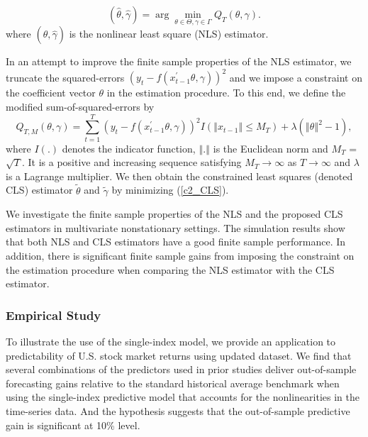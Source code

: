 \documentclass[a4paper,12pt,times,numbered,print,index]{report}
\numberwithin{equation}{section}
\begin{document}
\begin{equation*}
\left( \widehat{\theta},\widehat{\gamma}\right) =\arg \min_{\theta \in \Theta
	,\gamma \in \Gamma }Q_{T}\left( \theta ,\gamma \right) .  
\end{equation*}%
where $\left( \widehat{\theta},\widehat{\gamma}\right)$ is the nonlinear least square (NLS) estimator. 

In an attempt to improve the finite sample properties of the NLS estimator, we truncate the squared-errors $\left( y_{t}-f\left(
x_{t-1}^{\prime }\theta ,\gamma \right) \right) ^{2}$ and we impose a constraint on the coefficient vector $\theta $ in the estimation procedure. To this end, we define the modified sum-of-squared-errors by%
\begin{equation}
Q_{T,M}\left( \theta ,\gamma \right) =\sum_{t=1}^{T}\left( y_{t}-f\left(
x_{t-1}^{\prime }\theta ,\gamma \right) \right) ^{2}I\left( \left\Vert
x_{t-1}\right\Vert \leq M_{T}\right) +\lambda \left( \left\Vert \theta
\right\Vert ^{2}-1\right) ,  
\label{c2_CLS}
\end{equation}%
where $I\left( .\right) $ denotes the indicator function, $%
\left\Vert .\right\Vert $ is the Euclidean norm and $M_T$ = $\sqrt{T}$. It is a positive and increasing sequence satisfying $ M_{T}\rightarrow \infty $ as $T \rightarrow \infty $ and $\lambda $ is a Lagrange
multiplier. We then obtain the constrained least squares (denoted CLS) estimator $\tilde{\theta }$ and $\tilde{\gamma}$ by minimizing (\ref{c2_CLS}).

We investigate the finite sample properties of the NLS and the proposed CLS estimators in multivariate nonstationary settings. The simulation results show that both NLS and CLS estimators have a good finite sample performance. In addition, there is significant finite sample gains from imposing the constraint on the estimation procedure when comparing the NLS estimator with the CLS estimator.

\subsubsection*{Empirical Study}
To illustrate the use of the single-index model, we provide an application to predictability of U.S. stock market returns using updated \cite{welch2008comprehensive} dataset. We find that several combinations of the predictors used in prior studies deliver out-of-sample forecasting gains relative to the standard historical average benchmark when using the single-index predictive model that accounts for the nonlinearities in the time-series data. And the hypothesis suggests that the out-of-sample predictive gain is significant at 10\% level.
\end{document}
